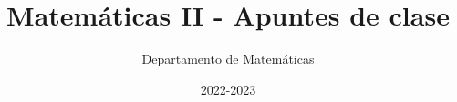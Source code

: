 \documentclass[nobuilddate]{Docencia}
\title{Matemáticas II - Apuntes de clase}
\author{Departamento de Matemáticas}
\date{2022-2023}
\begin{document}
\pagestyle{plain}
\maketitle
\tableofcontents
\newpage

\newcommand{\hide}[1]{#1}

\renewcommand{\vec}[1]{\overrightarrow{#1}}



    
    

    











\newpage
\printindex
\listoffigures
\listoftables
\end{document}
